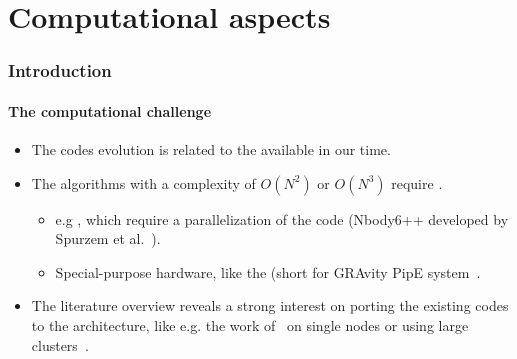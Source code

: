 \section{Computational aspects}
\begin{frame}
    \frametitle{Introduction}
    \framesubtitle{The computational challenge}

    \begin{itemize}
        \item The {\nbody} codes evolution is related to the available
                 in our time.
        \item The algorithms with a complexity of $O(N^{2})$ or $O(N^{3})$ require
                .
        \begin{itemize}
            \item  e.g ,
                which require a parallelization of the code
                ({\sc Nbody6++} developed by Spurzem et al.~\cite{Spurzem1999}).

            \item Special-purpose hardware, like the  (short for GRAvity
                PipE system~\cite{TMFES96,MT98,Makino98,GRAPE6A}.

        \end{itemize}

        \item  The literature overview reveals a strong interest on porting the existing codes to the
             architecture, like e.g. the work
            of~\cite{Portegies2007a,Hamada2007,Belleman2008}
            on single nodes or using large
            clusters~\cite{berczik2011high,NitadoriAarseth2012,Capuzzo-DolcettaEtAl2013}.

    \end{itemize}

\end{frame}

